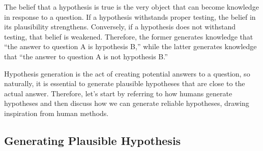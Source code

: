 The belief that a hypothesis is true is the very object that can become knowledge in response to a question. If a hypothesis withstands proper testing, the belief in its plausibility strengthens. Conversely, if a hypothesis does not withstand testing, that belief is weakened. Therefore, the former generates knowledge that ``the answer to question A is hypothesis B,'' while the latter generates knowledge that ``the answer to question A is not hypothesis B.'' 

Hypothesis generation is the act of creating potential answers to a question, so naturally, it is essential to generate plausible hypotheses that are close to the actual answer. Therefore, let's start by referring to how humans generate hypotheses and then discuss how we can generate reliable hypotheses, drawing inspiration from human methods.

\subsection{Generating Plausible Hypothesis}

